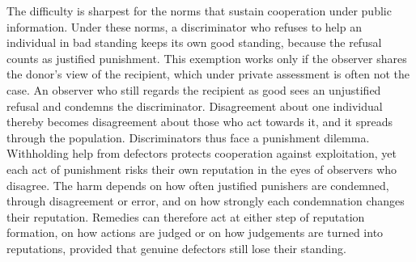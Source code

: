 The difficulty is sharpest for the norms that sustain cooperation under public information. Under these norms, a discriminator who refuses to help an individual in bad standing keeps its own good standing, because the refusal counts as justified punishment\cite{panchanathan2003,ohtsuki2004,okada2020dilemmas}. This exemption works only if the observer shares the donor's view of the recipient, which under private assessment is often not the case. An observer who still regards the recipient as good sees an unjustified refusal and condemns the discriminator. Disagreement about one individual thereby becomes disagreement about those who act towards it, and it spreads through the population\cite{hilbe2018,uchida2013,radzvilavicius2019}. Discriminators thus face a punishment dilemma. Withholding help from defectors protects cooperation against exploitation, yet each act of punishment risks their own reputation in the eyes of observers who disagree\cite{okada2020dilemmas,michelmata2024,pires2025}. The harm depends on how often justified punishers are condemned, through disagreement or error, and on how strongly each condemnation changes their reputation. Remedies can therefore act at either step of reputation formation, on how actions are judged or on how judgements are turned into reputations, provided that genuine defectors still lose their standing.
